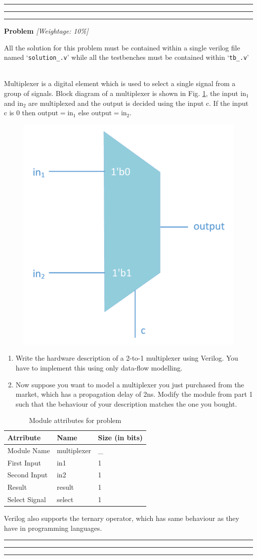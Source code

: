 \documentclass[a4paper,10pt]{article}
\theoremstyle{mytheor}
\newcounter{problemNumber}
\newcommand {
  \insertProblem}[2]{
  \vspace{0.5cm}
  \hrule \hrule \hrule
  \vspace{0.3cm}
  
  {
    \setlength{\parindent}{0}

    {
      \color{greatblue}
      \textbf{\Large{Problem \theproblemNumber}}
      \hfill
      \textit{[Weightage: #1]}
    }

    {
      \centering
      \begin{center}
        \lfseries \footnotesize All the solution for this problem
        must be contained within a single verilog file named
        `\texttt{solution\_\theproblemNumber.v}' while all the
        testbenches must be contained within
          `\texttt{tb\_\theproblemNumber.v}'
        \end{center}
      }
      
    }
    
  \vspace{6pt}\\#2

  \addtocounter{problemNumber}{1}

  \vspace{0.2cm}
  \hrule \hrule \hrule
  \vspace{0.5cm}
}
\newcounter{hintCount} %
\newcommand{\hintcounter}[1]{%
  \refstepcounter{hintCount}%
  \thehintCount%
  \label{#1}}%
\newcounter{hintcnt}
\newcommand{\hint}[2] {
  \begin{tcolorbox}[arc=1pt,colback=blue!5!white,colframe=blue!75!black,title=\textbf{Hint - \hintcounter{#1}}]  
    #2
  \end{tcolorbox}
  \addtocounter{hintcnt}{1}
}
\begin{document}
\insertProblem {10\%} { Multiplexer is a digital element which is used to
  select a single signal from a group of signals. Block diagram of a
  multiplexer is shown in Fig. \ref{multiplexer}, the input
  $\text{in}_1$ and $\text{in}_2$ are multiplexed and the output is
  decided using the input $\text{c}$. If the input c is 0 then
  $\text{output}=\text{in}_1$ else $\text{output}=\text{in}_2$.
  
  \begin{figure}[!h] \centering  
    \includegraphics[width=0.3\linewidth]{./resources/multiplexer.pdf} 
    \caption{} 
    \label{multiplexer} 
  \end{figure}

  \begin{enumerate}    
  \item Write the hardware description of a 2-to-1 multiplexer using
    Verilog. You have to implement this using only data-flow
    modelling.
  \item Now suppose you want to model a multiplexer you just purchased
    from the market, which has a propagation delay of 2ns. Modify the
    module from part 1 such that the behaviour of your description
    matches the one you bought.
    
  \end{enumerate}
    \begin{table}[!ht]
      \centering
      \caption{Module attributes for problem \theproblemNumber}
      \renewcommand{\arraystretch}{1.1}
      \begin{tabularx}{0.8\textwidth}{|X|X|X|}
        \hline
        \rowcolor{greatblue}
        \color{white} Atrribute & \color{white}Name & \color{white}Size (in bits) \\
        \hline
        Module Name   & multiplexer     & \_  \\
        First Input   & in1             &  1  \\
        Second Input  & in2             &  1  \\
        Result        & result          &  1  \\
        Select Signal & select          &  1  \\
        \hline
      \end{tabularx}
    \end{table}

    \hint{hint:problem-2}{Verilog also supports the ternary operator, which has same
      behaviour as they have in programming languages.}
}
\end{document}
